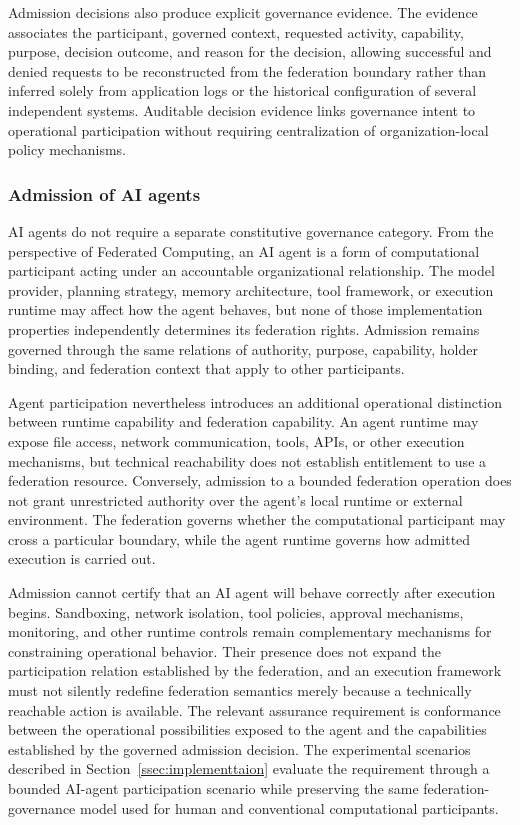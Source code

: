 \documentclass[twoside,11pt]{article}
\begin{document}
Admission decisions also produce explicit governance evidence. The evidence associates the participant, governed context, requested activity, capability, purpose, decision outcome, and reason for the decision, allowing successful and denied requests to be reconstructed from the federation boundary rather than inferred solely from application logs or the historical configuration of several independent systems. Auditable decision evidence   links governance intent to operational participation without requiring centralization of organization-local policy mechanisms.

\subsubsection{Admission of AI agents}
AI agents do not require a separate constitutive governance category. From the perspective of Federated Computing, an AI agent is a form of computational participant acting under an accountable organizational relationship. The model provider, planning strategy, memory architecture, tool framework, or execution runtime may affect how the agent behaves, but none of those implementation properties independently determines its federation rights. Admission remains governed through the same relations of authority, purpose, capability, holder binding, and federation context that apply to other participants.

Agent participation nevertheless introduces an additional operational distinction between runtime capability and federation capability. An agent runtime may expose file access, network communication, tools, APIs, or other execution mechanisms, but technical reachability does not establish entitlement to use a federation resource. Conversely, admission to a bounded federation operation does not grant unrestricted authority over the agent's local runtime or external environment. The federation   governs whether the computational participant may cross a particular boundary, while the agent runtime governs how admitted execution is carried out.

Admission cannot certify that an AI agent will behave correctly after execution begins. Sandboxing, network isolation, tool policies, approval mechanisms, monitoring, and other runtime controls remain complementary mechanisms for constraining operational behavior. Their presence does not expand the participation relation established by the federation, and an execution framework must not silently redefine federation semantics merely because a technically reachable action is available. The relevant assurance requirement is   conformance between the operational possibilities exposed to the agent and the capabilities established by the governed admission decision. The experimental scenarios described in Section~\ref{ssec:implementtaion} evaluate the requirement through a bounded AI-agent participation scenario while preserving the same federation-governance model used for human and conventional computational participants.
\end{document}
